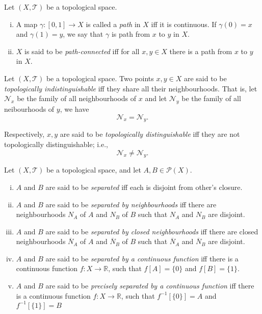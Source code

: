 \begin{definition}
	\label{def: path-connectedness}
	Let $(X, \mathcal T)$ be a topological space.
	\begin{enumerate}[(i)]
		\item A map $\gamma: [0,1] \to X$ is called a \textit{path} in $X$ iff it is continuous. If $\gamma(0) = x$ and $\gamma(1)=y$, we say that $\gamma$ is path from $x$ to $y$ in $X$.
		\item $X$ is said to be \textit{path-connected} iff for all $x, y \in X$ there is a path from $x$ to $y$ in $X$.
	\end{enumerate}
\end{definition}


\begin{definition}
	\label{def: topologically indistinguishable}
	Let $(X, \mathcal T)$ be a topological space. Two points $x,y \in X$ are said to be \textit{topologically indistinguishable} iff they share all their neighbourhoods. That is, let $\mathcal N_x$ be the family of all neighbourhoods of $x$ and let $\mathcal N_y$ be the family of all neibourhoods of $y$, we have
	$$
	\mathcal N_x = \mathcal N_y.
	$$
	
	Respectively, $x,y$ are said to be \textit{topologically distinguishable} iff they are not topologically distinguishable; i.e.,
	$$
	\mathcal N_x \ne \mathcal N_y.
	$$
\end{definition}


\begin{definition}
	Let $(X, \mathcal T)$ be a topological space, and let $A, B \in \mathcal P(X)$.
	
	\begin{enumerate}[(i)]
		\item $A$ and $B$ are said to be \textit{separated} iff each is disjoint from other's closure.
		\item $A$ and $B$ are said to be \textit{separated by neighbourhoods} iff there are neighbourhoods $N_A$ of $A$ and $N_B$ of $B$ such that $N_A$ and $N_B$ are disjoint.
		\item $A$ and $B$ are said to be \textit{separated by closed neighbourhoods} iff there are closed neighbourhoods $\overline N_A$ of $A$ and $\overline N_B$ of $B$ such that $\overline N_A$ and $\overline N_B$ are disjoint.
		\item $A$ and $B$ are said to be \textit{separated by a continuous function} iff there is a continuous function $f: X \to \mathbb R$, such that $f[A] = \{0\}$ and $f[B] = \{1\}$.
		\item $A$ and $B$ are said to be \textit{precisely separated by a continuous function} iff there is a continuous function $f: X \to \mathbb R$, such that $f^{-1}[\{0\}] = A$ and $f^{-1}[\{1\}] = B$
	\end{enumerate}
\end{definition}


